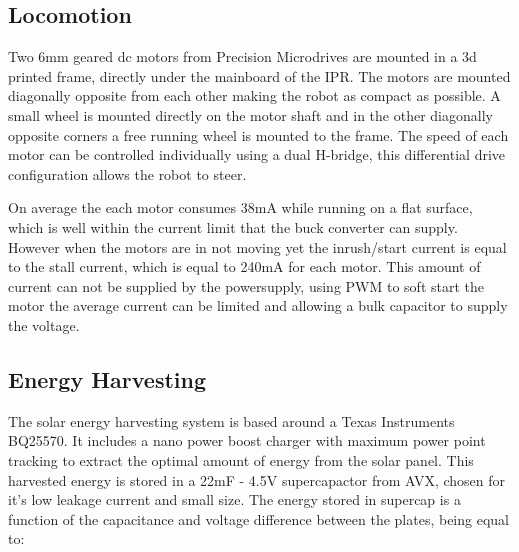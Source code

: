 \subsection{Locomotion}

Two 6mm geared dc motors from Precision Microdrives are mounted in a 3d printed frame, directly under the mainboard of the IPR.
The motors are mounted diagonally opposite from each other making the robot as compact as possible.
A small wheel is mounted directly on the motor shaft and in the other diagonally opposite corners a free running wheel is mounted to the frame.
The speed of each motor can be controlled individually using a dual H-bridge, this differential drive configuration allows the robot to steer.

On average the each motor consumes 38mA while running on a flat surface, which is well within the current limit that the buck converter can supply.
However when the motors are in not moving yet the inrush/start current is equal to the stall current, which is equal to 240mA for each motor.
This amount of current can not be supplied by the powersupply, using PWM to soft start the motor the average current can be limited and allowing a bulk capacitor to supply the voltage.

\subsection{Energy Harvesting}
\label{subsec:energy_harvesting}




The solar energy harvesting system is based around a Texas Instruments BQ25570. 
It includes a nano power boost charger with maximum power point tracking to extract the optimal amount of energy from the solar panel. 
This harvested energy is stored in a 22mF - 4.5V supercapactor from AVX, chosen for it's low leakage current and small size.
The energy stored in supercap is a function of the capacitance and voltage difference between the plates, being equal to:

